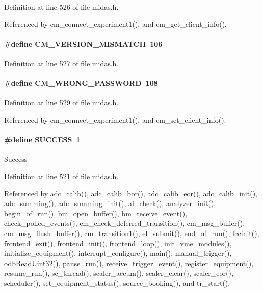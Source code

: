 Definition at line 526 of file midas.h.

Referenced by cm\_\-connect\_\-experiment1(), and cm\_\-get\_\-client\_\-info().
\paragraph[{CM\_\-VERSION\_\-MISMATCH}]{\setlength{\rightskip}{0pt plus 5cm}\#define CM\_\-VERSION\_\-MISMATCH~106}\hfill\label{group__err21_gae706ef5a8d5795d01ba8fa67d6db6302}

\begin{DoxyItemize}
\item 
\end{DoxyItemize}

Definition at line 527 of file midas.h.
\paragraph[{CM\_\-WRONG\_\-PASSWORD}]{\setlength{\rightskip}{0pt plus 5cm}\#define CM\_\-WRONG\_\-PASSWORD~108}\hfill\label{group__err21_ga9a26da1c28eadf3f46a335b41520ecd8}

\begin{DoxyItemize}
\item 
\end{DoxyItemize}

Definition at line 529 of file midas.h.

Referenced by cm\_\-connect\_\-experiment1(), and cm\_\-set\_\-client\_\-info().
\paragraph[{SUCCESS}]{\setlength{\rightskip}{0pt plus 5cm}\#define SUCCESS~1}\hfill\label{group__err21_gaa90cac659d18e8ef6294c7ae337f6b58}
Success 

Definition at line 521 of file midas.h.

Referenced by adc\_\-calib(), adc\_\-calib\_\-bor(), adc\_\-calib\_\-eor(), adc\_\-calib\_\-init(), adc\_\-summing(), adc\_\-summing\_\-init(), al\_\-check(), analyzer\_\-init(), begin\_\-of\_\-run(), bm\_\-open\_\-buffer(), bm\_\-receive\_\-event(), check\_\-polled\_\-events(), cm\_\-check\_\-deferred\_\-transition(), cm\_\-msg\_\-buffer(), cm\_\-msg\_\-flush\_\-buffer(), cm\_\-transition1(), el\_\-submit(), end\_\-of\_\-run(), fccinit(), frontend\_\-exit(), frontend\_\-init(), frontend\_\-loop(), init\_\-vme\_\-modules(), initialize\_\-equipment(), interrupt\_\-configure(), main(), manual\_\-trigger(), odbReadUint32(), pause\_\-run(), receive\_\-trigger\_\-event(), register\_\-equipment(), resume\_\-run(), sc\_\-thread(), scaler\_\-accum(), scaler\_\-clear(), scaler\_\-eor(), scheduler(), set\_\-equipment\_\-status(), source\_\-booking(), and tr\_\-start().
